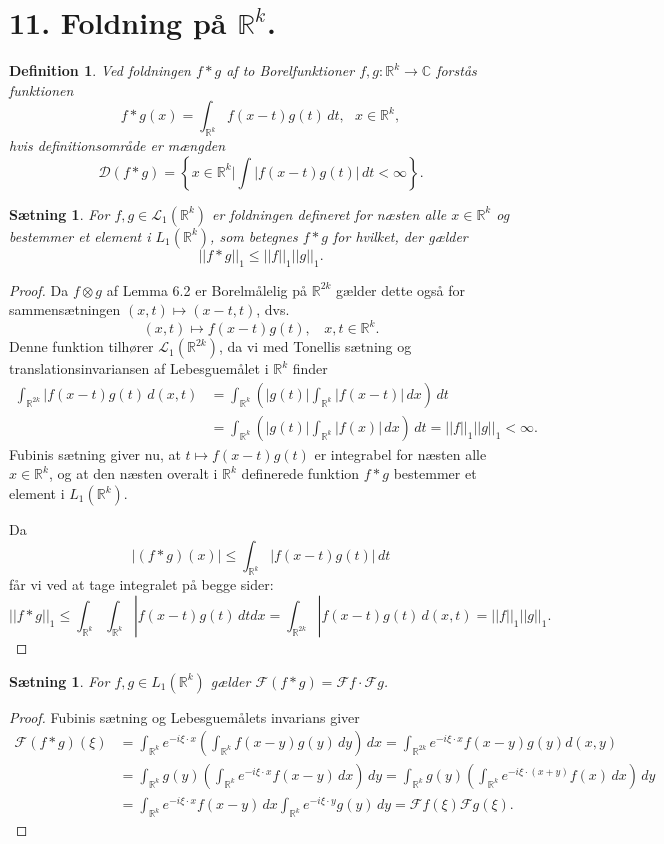 \documentclass[12pt]{report}
\newtheorem{theorem}[lemma]{Sætning}
\newtheorem{definition}[lemma]{Definition}
\theoremstyle{break}
\newtheorem*{proof}{Bevis}
\theoremstyle{break}
\newcommand{\RR}{\mathbb{R}}
\newcommand{\DD}{\mathcal{D}}
\newcommand{\FI}{\mathcal{F}}
\renewcommand{\L}{\mathcal{L}}
\newcommand{\laengde}[1]{\lvert|#1\rvert|}
\newcommand{\1}{\mathds{1}}
\begin{document}
\section*{11. Foldning på $\RR^k$.}
\begin{definition}
Ved foldningen $f\ast g$ af to Borelfunktioner $f,g\colon\RR^k\to\mathbb{C}$ forstås funktionen \[f\ast g(x)=\int_{\RR^k}f(x-t)g(t)\,dt,~~~x\in\RR^k,\]
hvis definitionsområde er mængden 
\[\DD(f\ast g) = \left\{x\in\RR^k\vert\int|f(x-t)g(t)|\,dt<\infty\right\}.\]
\end{definition}
\begin{theorem}
For $f,g\in\L_1(\RR^k)$ er foldningen defineret for næsten alle $x\in\RR^k$ og bestemmer et element i $L_1(\RR^k)$, som betegnes $f\ast g$ for hvilket, der gælder \[\laengde{f\ast g}_1\leq\laengde{f}_1\laengde{g}_1.\]
\end{theorem}
\begin{proof}
Da $f\otimes g$ af Lemma 6.2 er Borelmålelig på $\RR^{2k}$ gælder dette også for sammensætningen $(x,t)\mapsto(x-t,t)$, dvs.
\[(x,t)\mapsto f(x-t)g(t),~~~~x,t\in\RR^k.\]
Denne funktion tilhører $\L_1(\RR^{2k})$, da vi med Tonellis sætning og translationsinvariansen af Lebesguemålet i $\RR^k$ finder
\begin{align*}
\int_{\RR^{2k}}|f(x-t)g(t)\,d(x,t) & =\int_{\RR^k}\left(|g(t)|\int_{\RR^k}|f(x-t)|\,dx\right)\,dt \\ &=\int_{\RR^k}\left(|g(t)|\int_{\RR^k}|f(x)|\,dx\right)\,dt = \laengde{f}_1\laengde{g}_1<\infty.
\end{align*}
Fubinis sætning giver nu, at $t\mapsto f(x-t)g(t)$ er integrabel for næsten alle $x\in\RR^k$, og at den næsten overalt i $\RR^k$ definerede funktion $f\ast g$ bestemmer et element i $L_1(\RR^k)$.

\bigskip

Da
\[|(f\ast g)(x)|\leq\int_{\RR^k}|f(x-t)g(t)|\,dt\]
får vi ved at tage integralet på begge sider:
\[\laengde{f\ast g}_1\leq\int_{\RR^k}\int_{\RR^k}|f(x-t)g(t)\,dtdx=\int_{\RR^{2k}}|f(x-t)g(t)\,d(x,t)=\laengde{f}_1\laengde{g}_1.\]
\end{proof}
\begin{theorem}
For $f,g\in L_1(\RR^k)$ gælder $\FI(f\ast g)=\FI f\cdot \FI g$.
\end{theorem}
\begin{proof}
Fubinis sætning og Lebesguemålets invarians giver
\begin{align*}
\FI(f\ast g)(\xi) & = \int_{\RR^k}e^{-i\xi\cdot x}\left(\int_{\RR^k}f(x-y)g(y)\,dy\right)\,dx = \int_{\RR^{2k}}e^{-i\xi\cdot x}f(x-y)g(y)d(x,y)\\ & = \int_{\RR^k}g(y)\left(\int_{\RR^k}e^{-i\xi\cdot x}f(x-y)\,dx\right)\,dy = \int_{\RR^k}g(y)\left(\int_{\RR^k}e^{-i\xi\cdot (x+y)}f(x)\,dx\right)\,dy \\ & = \int_{\RR^k}e^{-i\xi\cdot x}f(x-y)\,dx\int_{\RR^k}e^{-i\xi\cdot y}g(y)\,dy = \FI f(\xi)\FI g(\xi).
\end{align*}
\end{proof}
\end{document}
